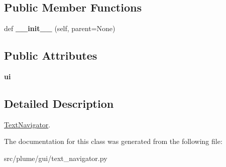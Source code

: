 \subsection*{Public Member Functions}
\begin{DoxyCompactItemize}
\item 
def {\bfseries \+\_\+\+\_\+init\+\_\+\+\_\+} (self, parent=None)\hypertarget{classplume-creator_1_1src_1_1plume_1_1gui_1_1text__navigator_1_1_text_navigator_ab966792e827cdc47241448c81c28c670}{}\label{classplume-creator_1_1src_1_1plume_1_1gui_1_1text__navigator_1_1_text_navigator_ab966792e827cdc47241448c81c28c670}

\end{DoxyCompactItemize}
\subsection*{Public Attributes}
\begin{DoxyCompactItemize}
\item 
{\bfseries ui}\hypertarget{classplume-creator_1_1src_1_1plume_1_1gui_1_1text__navigator_1_1_text_navigator_aae21194d11ff76c97df00a5ae15b30fe}{}\label{classplume-creator_1_1src_1_1plume_1_1gui_1_1text__navigator_1_1_text_navigator_aae21194d11ff76c97df00a5ae15b30fe}

\end{DoxyCompactItemize}


\subsection{Detailed Description}
\hyperlink{classplume-creator_1_1src_1_1plume_1_1gui_1_1text__navigator_1_1_text_navigator}{Text\+Navigator}. 

The documentation for this class was generated from the following file\+:\begin{DoxyCompactItemize}
\item 
src/plume/gui/text\+\_\+navigator.\+py\end{DoxyCompactItemize}
